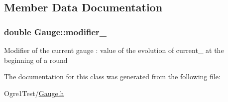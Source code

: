 \subsection{Member Data Documentation}
\subsubsection[{\texorpdfstring{modifier\+\_\+}{modifier_}}]{\setlength{\rightskip}{0pt plus 5cm}double Gauge\+::modifier\+\_\+\hspace{0.3cm}{\ttfamily [protected]}}\hypertarget{class_gauge_a92907a4fc9bab701e02e16bea129409c}{}\label{class_gauge_a92907a4fc9bab701e02e16bea129409c}
Modifier of the current gauge \+: value of the evolution of current\+\_\+ at the beginning of a round 

The documentation for this class was generated from the following file\+:\begin{DoxyCompactItemize}
\item 
Ogre1\+Test/\hyperlink{_gauge_8h}{Gauge.\+h}\end{DoxyCompactItemize}

